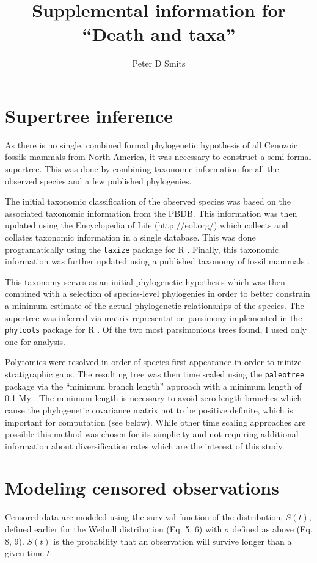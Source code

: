 \documentclass{article}
\title{Supplemental information for ``Death and taxa''}
\author{Peter D Smits}
\date{}
\begin{document}
\maketitle

\section{Supertree inference}
As there is no single, combined formal phylogenetic hypothesis of all Cenozoic fossils mammals from North America, it was necessary to construct a semi-formal supertree. This was done by combining taxonomic information for all the observed species and a few published phylogenies. 

The initial taxonomic classification of the observed species was based on the associated taxonomic information from the PBDB. This information was then updated using the Encyclopedia of Life (http://eol.org/) which collects and collates taxonomic information in a single database. This was done programatically using the \texttt{taxize} package for R \cite{2013taxize}. Finally, this taxonomic information was further updated using a published taxonomy of fossil mammals \cite{Janis2008,Janis1998}. 

This taxonomy serves as an initial phylogenetic hypothesis which was then combined with a selection of species-level phylogenies \cite{Bininda-Emonds2007,Raia2012f} in order to better constrain a minimum estimate of the actual phylogenetic relationships of the species. The supertree was inferred via matrix representation parsimony implemented in the \texttt{phytools} package for R \cite{revell2012phytools}. Of the two most parsimonious trees found, I used only one for analysis.

Polytomies were resolved in order of species first appearance in order to minize stratigraphic gaps. The resulting tree was then time scaled using the \texttt{paleotree} package via the ``minimum branch length'' approach with a minimum length of 0.1 My \cite{Bapst2012a}. The minimum length is necessary to avoid zero-length branches which cause the phylogenetic covariance matrix not to be positive definite, which is important for computation (see below). While other time scaling approaches are possible \cite{Bapst2013a,Hedman2010} this method was chosen for its simplicity and not requiring additional information about diversification rates which are the interest of this study.

\section{Modeling censored observations}
Censored data are modeled using the survival function of the distribution, \(S(t)\), defined earlier for the Weibull distribution (Eq. 5, 6) with \(\sigma\) defined as above (Eq. 8, 9). \(S(t)\) is the probability that an observation will survive longer than a given time \(t\). 
\end{document}
